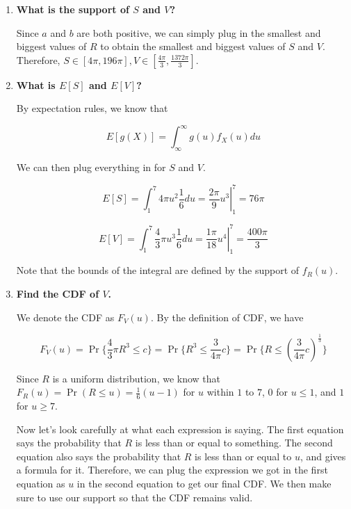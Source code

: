 \documentclass{article}
\begin{document}
\begin{enumerate}[label=(\alph*)]
    \item \textbf{What is the support of $S$ and $V$?}
    
    Since $a$ and $b$ are both positive, we can simply plug in the smallest and biggest values of $R$ to obtain the smallest and biggest values of $S$ and $V$. Therefore, $\boxed{S \in [4\pi, 196\pi], V \in [\frac{4\pi}{3}, \frac{1372\pi}{3}]}$.

    \vspace{2cm}
    
    \item \textbf{What is $E[S]$ and $E[V]$?}
    
    By expectation rules, we know that
    
    $$E[g(X)] = \int_{\infty}^{\infty}g(u) f_X(u) du$$
    
    We can then plug everything in for $S$ and $V$.
    
    $$E[S] = \int_1^7 4 \pi u^2 \frac{1}{6} du = \left. \frac{2\pi}{9}u^3 \right\rvert_1^7 = \boxed{76 \pi}$$
    
    $$E[V] = \int_1^7 \frac{4}{3}\pi u^3 \frac{1}{6} du = \left. \frac{1\pi}{18}u^4 \right\rvert_1^7 = \boxed{\frac{400\pi}{3}}$$
    
    Note that the bounds of the integral are defined by the support of $f_R(u)$.

    \vspace{2cm}
    
    \item \textbf{Find the CDF of $V$.}
    
    We denote the CDF as $F_V(u)$. By the definition of CDF, we have
    
    $$F_V(u) = \Pr\{\frac{4}{3} \pi R^3 \leq c\} = \Pr\{R^3 \leq \frac{3}{4\pi }c\} = \Pr\{R \leq \left(\frac{3}{4\pi }c\right)^{\frac{1}{3}}\}$$
    
    Since $R$ is a uniform distribution, we know that $F_R(u) = \Pr(R \leq u) = \frac{1}{6}(u - 1)$ for $u$ within $1$ to $7$, $0$ for $u \leq 1$, and $1$ for $u \geq 7$.
    
    Now let's look carefully at what each expression is saying. The first equation says the probability that $R$ is less than or equal to something. The second equation also says the probability that $R$ is less than or equal to $u$, and gives a formula for it. Therefore, we can plug the expression we got in the first equation as $u$ in the second equation to get our final CDF. We then make sure to use our support so that the CDF remains valid.
    

\end{enumerate}
\end{document}
